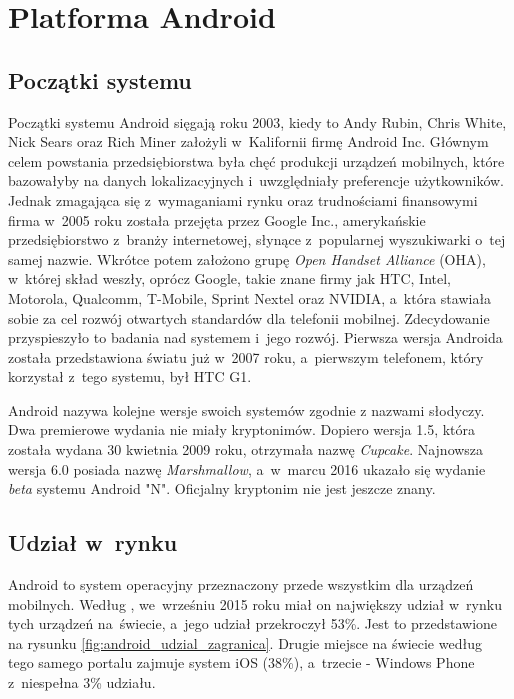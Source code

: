 \chapter{Platforma Android}

\section{Początki systemu}
Początki systemu Android sięgają roku 2003, kiedy to Andy Rubin, Chris White, Nick Sears oraz Rich Miner założyli w~Kalifornii firmę Android Inc. Głównym celem powstania przedsiębiorstwa była chęć produkcji urządzeń mobilnych, które bazowałyby na danych lokalizacyjnych i~uwzględniały preferencje użytkowników. Jednak zmagająca się z~wymaganiami rynku oraz trudnościami finansowymi firma w~2005 roku została przejęta przez Google Inc., amerykańskie przedsiębiorstwo z~branży internetowej, słynące z~popularnej wyszukiwarki o~tej samej nazwie. Wkrótce potem założono grupę \textit{Open Handset Alliance} (OHA), w~której skład weszły, oprócz Google, takie znane firmy jak HTC, Intel, Motorola, Qualcomm, T-Mobile, Sprint Nextel oraz NVIDIA, a~która stawiała sobie za cel rozwój otwartych standardów dla telefonii mobilnej. Zdecydowanie przyspieszyło to badania nad systemem i~jego rozwój. Pierwsza wersja Androida została przedstawiona światu już w~2007 roku, a~pierwszym telefonem, który korzystał z~tego systemu, był HTC G1.

Android nazywa kolejne wersje swoich systemów zgodnie z nazwami słodyczy. Dwa premierowe wydania nie miały kryptonimów. Dopiero wersja 1.5, która została wydana 30 kwietnia 2009 roku, otrzymała nazwę \textit{Cupcake}. Najnowsza wersja 6.0 posiada nazwę \textit{Marshmallow}, a~w~marcu 2016 ukazało się wydanie \textit{beta} systemu Android "N". Oficjalny kryptonim nie jest jeszcze znany.

\section{Udział w~rynku}
Android to system operacyjny przeznaczony przede wszystkim dla urządzeń mobilnych. Według \cite{website:android:stat2}, we~wrześniu 2015 roku miał on największy udział w~rynku tych urządzeń na~świecie, a~jego udział przekroczył 53\%. Jest to przedstawione na rysunku \ref{fig:android_udzial_zagranica}. Drugie miejsce na świecie według tego samego portalu zajmuje system iOS (38\%), a~trzecie - Windows Phone z~niespełna 3\% udziału. 

